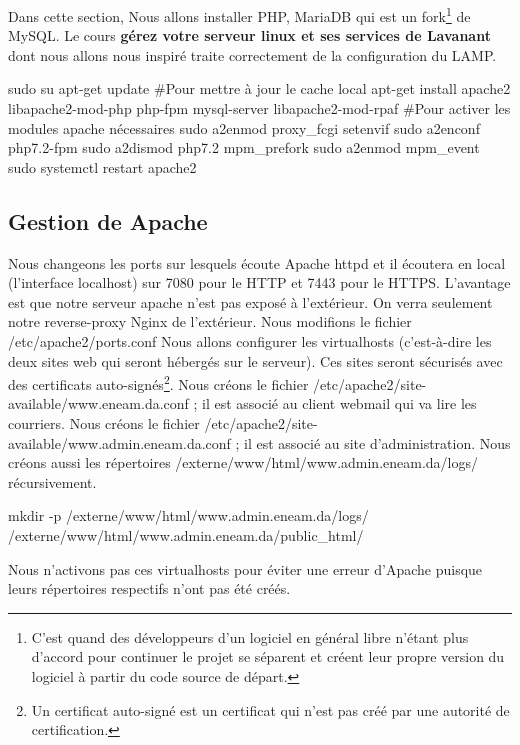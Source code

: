 \documentclass[a4paper,12pt,french]{report} %
\begin{document}
Dans cette section, Nous allons installer PHP, MariaDB qui est un fork\footnote{C'est quand des développeurs d'un logiciel en général libre n'étant plus d'accord pour continuer le projet se séparent et créent leur propre version du logiciel à partir du code source de départ.} de MySQL. Le cours  \textbf{gérez votre serveur linux et ses services de Lavanant
} dont nous allons nous inspiré traite correctement de la configuration du LAMP.
\begin{exempleConsole}
sudo su
apt-get update #Pour mettre à jour le cache local
apt-get install apache2 libapache2-mod-php php-fpm mysql-server libapache2-mod-rpaf
#Pour activer les modules apache nécessaires
sudo a2enmod proxy_fcgi setenvif
sudo a2enconf php7.2-fpm
sudo a2dismod php7.2 mpm_prefork
sudo a2enmod mpm_event
sudo systemctl restart apache2
\end{exempleConsole}

\subsection{Gestion de Apache}
Nous changeons les ports sur lesquels écoute Apache httpd et il écoutera en local (l'interface localhost) sur 7080 pour le HTTP et 7443 pour le HTTPS. L'avantage est que notre serveur apache n'est pas exposé à l'extérieur. On verra seulement notre reverse-proxy Nginx de l'extérieur. Nous modifions le fichier /etc/apache2/ports.conf
Nous allons configurer les virtualhosts (c'est-à-dire les deux sites web qui seront hébergés sur le serveur). Ces sites seront sécurisés avec des certificats auto-signés\footnote{Un certificat auto-signé est un certificat qui n'est pas créé par une autorité de certification.}.\label{ref:rainloop}
Nous créons le fichier /etc/apache2/site-available/www.eneam.da.conf ; il est associé au client webmail qui va lire les courriers.
\cesure
{}
\nocesure
Nous créons le fichier /etc/apache2/site-available/www.admin.eneam.da.conf ; il est associé au site d'administration. 
\cesure
{}
\nocesure
Nous créons aussi les répertoires /externe/www/html/www.admin.eneam.da/logs/ récursivement.
\begin{exempleConsole}
mkdir -p /externe/www/html/www.admin.eneam.da/logs/ /externe/www/html/www.admin.eneam.da/public_html/
\end{exempleConsole}
Nous n'activons pas ces virtualhosts pour éviter une erreur d'Apache puisque leurs répertoires respectifs n'ont pas été créés.
\end{document}
